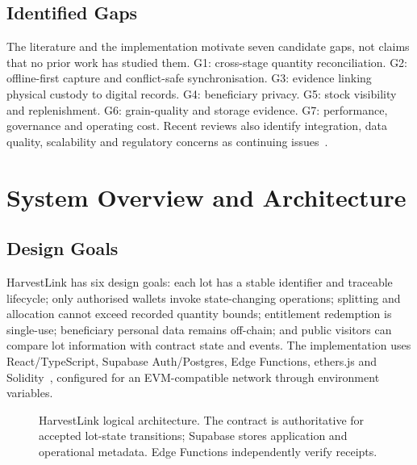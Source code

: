 \documentclass[conference,a4paper]{IEEEtran}
\begin{document}
\subsection{Identified Gaps}
The literature and the implementation motivate seven candidate gaps, not claims that no prior work has studied them. G1: cross-stage quantity reconciliation. G2: offline-first capture and conflict-safe synchronisation. G3: evidence linking physical custody to digital records. G4: beneficiary privacy. G5: stock visibility and replenishment. G6: grain-quality and storage evidence. G7: performance, governance and operating cost. Recent reviews also identify integration, data quality, scalability and regulatory concerns as continuing issues~\cite{vasileiou2026,yu2024}.

\section{System Overview and Architecture}
\subsection{Design Goals}
HarvestLink has six design goals: each lot has a stable identifier and traceable lifecycle; only authorised wallets invoke state-changing operations; splitting and allocation cannot exceed recorded quantity bounds; entitlement redemption is single-use; beneficiary personal data remains off-chain; and public visitors can compare lot information with contract state and events. The implementation uses React/TypeScript, Supabase Auth/Postgres, Edge Functions, ethers.js and Solidity~\cite{wood2014,openzeppelin}, configured for an EVM-compatible network through environment variables.

\begin{figure}[!t]
\centering
{}
\caption{HarvestLink logical architecture. The contract is authoritative for accepted lot-state transitions; Supabase stores application and operational metadata. Edge Functions independently verify receipts.}
\label{fig:arch}
\end{figure}
\end{document}
